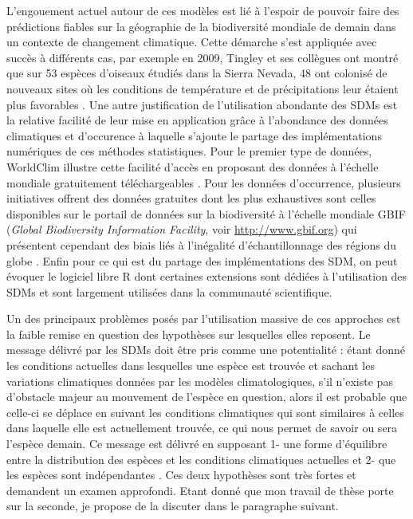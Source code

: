 L'engouement actuel autour de ces modèles est lié à l'espoir de pouvoir
faire des prédictions fiables sur la géographie de la biodiversité
mondiale de demain dans un contexte de changement climatique. Cette
démarche s'est appliquée avec succès à différents cas, par exemple en
2009, Tingley et ses collègues ont montré que sur 53 espèces d'oiseaux
étudiés dans la Sierra Nevada, 48 ont colonisé de nouveaux sites où les
conditions de température et de précipitations leur étaient plus
favorables \citep{Tingley2009}. Une autre justification de l'utilisation
abondante des SDMs est la relative facilité de leur mise en application
grâce à l'abondance des données climatiques et d'occurence à laquelle
s'ajoute le partage des implémentations numériques de ces méthodes
statistiques. Pour le premier type de données, WorldClim illustre cette
facilité d'accès en proposant des données à l'échelle mondiale
gratuitement téléchargeables \citep[voir
\url{http://worldclim.org}][]{Hijmans2005}. Pour les données
d'occurrence, plusieurs initiatives offrent des données gratuites dont
les plus exhaustives sont celles disponibles sur le portail de données
sur la biodiversité à l'échelle mondiale GBIF (\emph{Global Biodiversity
Information Facility}, voir \url{http://www.gbif.org}) qui présentent
cependant des biais liés à l'inégalité d'échantillonnage des régions du
globe \citep{Beck2014a}. Enfin pour ce qui est du partage des
implémentations des SDM, on peut évoquer le logiciel libre R
\citep{Rcoreteam2015} dont certaines extensions sont dédiées à
l'utilisation des SDMs et sont largement utilisées dans la communauté
scientifique.

Un des principaux problèmes posés par l'utilisation massive de ces
approches est la faible remise en question des hypothèses sur lesquelles
elles reposent. Le message délivré par les SDMs doit être pris comme une
potentialité : étant donné les conditions actuelles dans lesquelles une
espèce est trouvée et sachant les variations climatiques données par les
modèles climatologiques, s'il n'existe pas d'obstacle majeur au
mouvement de l'espèce en question, alors il est probable que celle-ci se
déplace en suivant les conditions climatiques qui sont similaires à
celles dans laquelle elle est actuellement trouvée, ce qui nous permet
de savoir ou sera l'espèce demain. Ce message est délivré en supposant
1- une forme d'équilibre entre la distribution des espèces et les
conditions climatiques actuelles et 2- que les espèces sont
indépendantes \citep{Jeschke2008}. Ces deux hypothèses sont très fortes
et demandent un examen approfondi. Etant donné que mon travail de thèse
porte sur la seconde, je propose de la discuter dans le paragraphe
suivant.

